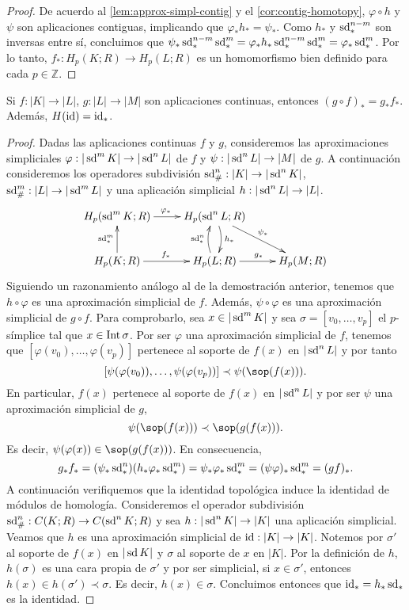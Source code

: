 \begin{proof}
	De acuerdo al \autoref{lem:approx-simpl-contig} y el \autoref{cor:contig-homotopy}, \( \varphi \circ h \) y \( \psi \) son aplicaciones contiguas, implicando que \( \varphi_*h_* = \psi_* \). Como \( h_* \) y \( \operatorname{sd}_*^{n-m} \) son inversas entre sí, concluimos que  \( \psi_* \operatorname{sd}_*^{n-m} \operatorname{sd}_*^m = \varphi_*h_*\operatorname{sd}_*^{n-m} \operatorname{sd}_*^m = \varphi_* \operatorname{sd}_*^m \). Por lo tanto, \( f_* : H_p(K; R) \to H_p(L; R) \) es un homomorfismo bien definido para cada \( p \in \mathbb{Z} \).
\end{proof}

\begin{teorema}
	Si $f: |K| \to |L|$, $g: |L| \to |M|$ son aplicaciones continuas, entonces $(g \circ f)_* = g_*f_*$. Además, $H(\operatorname{id}) = \operatorname{id}_*$.
\end{teorema}
\begin{proof}
	Dadas las aplicaciones continuas $f$ y $g$, consideremos las aproximaciones simpliciales $\varphi : |\operatorname{sd}^m K| \to |\operatorname{sd}^n L|$ de $f$ y $\psi : |\operatorname{sd}^n L| \to |M|$ de $g$. A continuación consideremos los operadores subdivisión $\operatorname{sd}_\#^n : |K| \to |\operatorname{sd}^n K|$, $\operatorname{sd}_\#^m : |L| \to |\operatorname{sd}^m L|$ y una aplicación simplicial $h : |\operatorname{sd}^n L| \to |L|$. 
	\[
	\xymatrix{
		H_p(\sd^m K;R) \ar@{->}[r]^{\varphi_*} & H_p(\sd^n L;R) \ar@{->}[rd]^{\psi_*} \ar@/^/@{->}[d]^{h_*} &  \\
		H_p(K;R) \ar@{->}[r]^{f_*} \ar@{->}[u]^{\sd^m_*} & H_p(L;R) \ar@{->}[r]^{g_*} \ar@/^/@{->}[u]^{\sd^n_*} & H_p(M;R)
	}
	\]
	Siguiendo un razonamiento análogo al de la demostración anterior, tenemos que $h \circ \varphi$ es una aproximación simplicial de $f$. Además, $\psi \circ \varphi$ es una aproximación simplicial de $g \circ f$. Para comprobarlo, sea $x \in |\operatorname{sd}^m K|$ y sea $\sigma = [v_0, \dots, v_p]$ el $p$-símplice tal que $x \in \operatorname{Int} \sigma$. Por ser $\varphi$ una aproximación simplicial de $f$, tenemos que $[\varphi(v_0), \dots, \varphi(v_p)]$ pertenece al soporte de $f(x)$ en $|\operatorname{sd}^n L|$ y por tanto
	\[
		[\psi(\varphi(v_0)), \dots, \psi(\varphi(v_p))] \prec \psi(\sop(f(x))).
	\]
	En particular, $f(x)$ pertenece al soporte de $f(x)$ en $|\operatorname{sd}^n L|$ y por ser $\psi$ una aproximación simplicial de $g$,
	\[
		\psi(\sop(f(x))) \prec \sop(g(f(x))).
	\]
	Es decir, $\psi(\varphi(x)) \in \sop(g(f(x)))$.  En consecuencia,
	\[
		g_*f_* = (\psi_* \operatorname{sd}_*^n)(h_* \varphi_* \operatorname{sd}_*^m) = \psi_* \varphi_* \operatorname{sd}_*^m = (\psi \varphi)_* \operatorname{sd}_*^m = (gf)_*.
	\]
	A continuación verifiquemos que la identidad topológica induce la identidad de módulos de homología. Consideremos el operador subdivisión $\operatorname{sd}_\#^n : C(K;R) \to C(\operatorname{sd}^n K;R)$ y sea $h : |\operatorname{sd}^n K| \to |K|$ una aplicación simplicial. Veamos que $h$ es una aproximación simplicial de $\operatorname{id} : |K| \to |K|$. Notemos por $\sigma'$ al soporte de $f(x)$ en $|\operatorname{sd} K|$ y $\sigma$ al soporte de $x$ en $|K|$. Por la definición de $h$, $h(\sigma)$ es una cara propia de $\sigma'$ y por ser simplicial, si $x \in \sigma'$, entonces $h(x) \in h(\sigma') \prec \sigma$. Es decir, $h(x) \in \sigma$. Concluimos entonces que $\operatorname{id}_* = h_* \operatorname{sd}_*$ es la identidad.
\end{proof}

